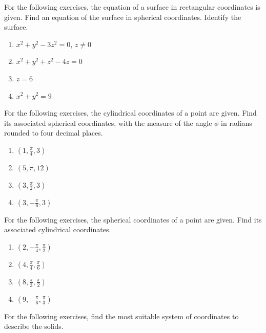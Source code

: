 \documentclass{exercises}
\begin{document}
For the following exercises, the equation of a surface in rectangular coordinates is given. Find an equation of the surface in spherical coordinates. Identify the surface.

\begin{enumerate}[resume]
\item $x^{2}+y^{2}-3z^{2}=0$, $z\ne0$
\item $x^{2}+y^{2}+z^{2}-4z=0$
\item $z=6$
\item $x^{2}+y^{2}=9$
\end{enumerate}

For the following exercises, the cylindrical coordinates of a point are given. Find its associated spherical coordinates, with the measure of the angle $\phi$ in radians rounded to four decimal places.

\begin{enumerate}[resume]
\item \techrequired $(1,\frac{\pi}{4},3)$
\item \techrequired $(5,\pi,12)$
\item $(3,\frac{\pi}{2},3)$
\item $(3,-\frac{\pi}{6},3)$
\end{enumerate}

For the following exercises, the spherical coordinates of a point are given. Find its associated cylindrical coordinates.

\begin{enumerate}[resume]
\item $(2,-\frac{\pi}{4},\frac{\pi}{2})$
\item $(4,\frac{\pi}{4},\frac{\pi}{6})$
\item $(8,\frac{\pi}{3},\frac{\pi}{2})$
\item $(9,-\frac{\pi}{6},\frac{\pi}{3})$
\end{enumerate}

For the following exercises, find the most suitable system of coordinates to describe the solids.
\end{document}
